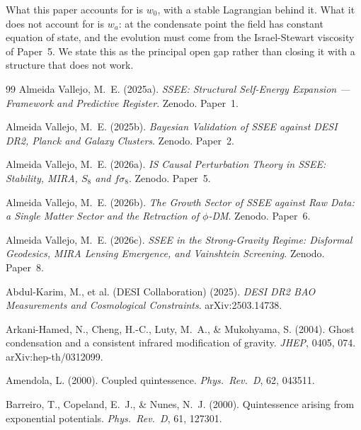 \documentclass[12pt,a4paper]{article}
\begin{document}
What this paper accounts for is $w_0$, with a stable Lagrangian behind
it.  What it does not account for is $w_a$: at the condensate point the
field has constant equation of state, and the evolution must come from
the Israel-Stewart viscosity of Paper~5.  We state this as the principal
open gap rather than closing it with a structure that does not work.
\clearpage
\begin{thebibliography}{99}
  Almeida Vallejo, M.~E. (2025a).
  \textit{SSEE: Structural Self-Energy Expansion — Framework and
  Predictive Register}. Zenodo. Paper~1.

  Almeida Vallejo, M.~E. (2025b).
  \textit{Bayesian Validation of SSEE against DESI DR2, Planck and
  Galaxy Clusters}. Zenodo. Paper~2.

  Almeida Vallejo, M.~E. (2026a).
  \textit{IS Causal Perturbation Theory in SSEE: Stability, MIRA,
  $S_8$ and $f\sigma_8$}. Zenodo. Paper~5.

  Almeida Vallejo, M.~E. (2026b).
  \textit{The Growth Sector of SSEE against Raw Data: a Single Matter
  Sector and the Retraction of $\phi$-DM}. Zenodo. Paper~6.

  Almeida Vallejo, M.~E. (2026c).
  \textit{SSEE in the Strong-Gravity Regime: Disformal Geodesics,
  MIRA Lensing Emergence, and Vainshtein Screening}. Zenodo. Paper~8.

  Abdul-Karim, M., et al. (DESI Collaboration) (2025).
  \textit{DESI DR2 BAO Measurements and Cosmological Constraints}.
  arXiv:2503.14738.

  Arkani-Hamed, N., Cheng, H.-C., Luty, M.~A., \& Mukohyama, S. (2004).
  Ghost condensation and a consistent infrared modification of gravity.
  \textit{JHEP}, 0405, 074.
  arXiv:hep-th/0312099.

  Amendola, L. (2000).
  Coupled quintessence.
  \textit{Phys.\ Rev.\ D}, 62, 043511.

  Barreiro, T., Copeland, E.~J., \& Nunes, N.~J. (2000).
  Quintessence arising from exponential potentials.
  \textit{Phys.\ Rev.\ D}, 61, 127301.


\end{thebibliography}
\end{document}
